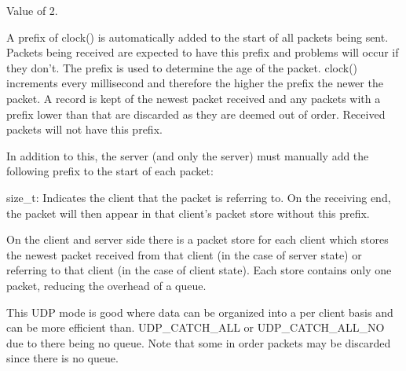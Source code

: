 \begin{Desc}
\begin{description}
Value of 2. \item[{\em 
\hypertarget{class_net_mode_a43cfa55ee6a4db66a8d7d6c27f766964abb3d396c14fdec8b8e5fd8a785dfba45}{
UDP\_\-PER\_\-CLIENT}
\label{class_net_mode_a43cfa55ee6a4db66a8d7d6c27f766964abb3d396c14fdec8b8e5fd8a785dfba45}
}]A prefix of clock() is automatically added to the start of all packets being sent. Packets being received are expected to have this prefix and problems will occur if they don't. The prefix is used to determine the age of the packet. clock() increments every millisecond and therefore the higher the prefix the newer the packet. A record is kept of the newest packet received and any packets with a prefix lower than that are discarded as they are deemed out of order. Received packets will not have this prefix. \par
\par


In addition to this, the server (and only the server) must manually add the following prefix to the start of each packet:
\begin{DoxyItemize}
\item size\_\-t: Indicates the client that the packet is referring to. On the receiving end, the packet will then appear in that client's packet store without this prefix.\par
\par

\end{DoxyItemize}

On the client and server side there is a packet store for each client which stores the newest packet received from that client (in the case of server state) or referring to that client (in the case of client state). Each store contains only one packet, reducing the overhead of a queue.\par
\par


This UDP mode is good where data can be organized into a per client basis and can be more efficient than. UDP\_\-CATCH\_\-ALL or UDP\_\-CATCH\_\-ALL\_\-NO due to there being no queue. Note that some in order packets may be discarded since there is no queue.\par
\par



\end{description}
\end{Desc}
